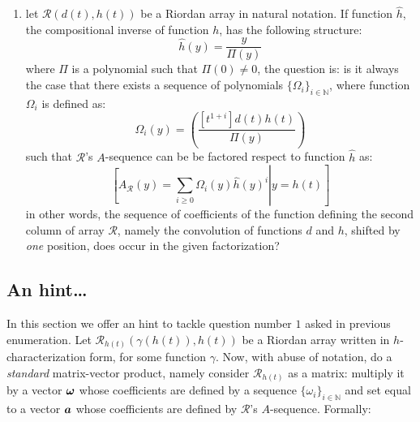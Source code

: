 \begin{enumerate}
    \item let $\mathcal{R}(d(t),h(t))$ be a Riordan array in 
        natural notation. If function $\hat{h}$, the compositional inverse
        of function $h$, has the following structure:
        \begin{displaymath}
            \hat{h}(y) = \frac{y}{\Pi(y)}
        \end{displaymath}
        where $\Pi$ is a polynomial such that $\Pi(0)\not=0$, the question is:
        is it always the case that there exists a sequence of polynomials
        $\lbrace \Omega_{i} \rbrace_{i\in\mathbb{N}}$, where function $\Omega_{i}$
        is defined as:
        \begin{displaymath}
            \Omega_{i}(y)=\left(\frac{[t^{1+i}]d(t)h(t)} {\Pi(y)}\right)
        \end{displaymath}
        such that $\mathcal{R}$'s $A$-sequence can be be factored respect to
        function $\hat{h}$ as:
        \begin{displaymath}
                \left.\left[
                    A_{\mathcal{R}}(y) = \sum_{i \geq0}{
                        \Omega_{i}(y) \hat{h}(y)^{i}} 
                        \right| y = h(t) \right]
        \end{displaymath}
        in other words, the sequence of coefficients of the function defining
        the second column of array $\mathcal{R}$, namely the convolution of functions 
        $d$ and $h$, shifted by \emph{one} position, does occur in
        the given factorization?

\end{enumerate}

\subsection{An hint\ldots}

In this section we offer an hint to tackle question number $1$
asked in previous enumeration. Let $\mathcal{R}_{h(t)}(\gamma(h(t)), h(t))$
be a Riordan array written in $h$-characterization form, for some function $\gamma$. 
Now, with abuse of notation, do a \emph{standard} matrix-vector product, namely
consider $\mathcal{R}_{h(t)}$ as a matrix: multiply it by a vector $\boldsymbol{\omega}$
whose coefficients are defined by a sequence $\lbrace \omega_i \rbrace_{i\in\mathbb{N}}$
and set equal to a vector $\boldsymbol{a}$ whose coefficients are defined by $\mathcal{R}$'s
$A$-sequence. Formally:

